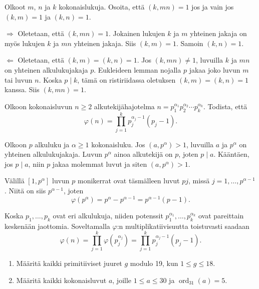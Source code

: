 \documentclass[11pt,a4paper]{amsart}
\begin{document}
\begin{exercise}
  Olkoot \(m\), \(n\) ja \(k\) kokonaislukuja. Osoita, että
  \((k,mn) = 1\) jos ja vain jos \((k,m) = 1\) ja
  \((k,n) = 1\).
\end{exercise}

\begin{solution}
  \(\Rightarrow\) Oletetaan, että \((k,mn)=1\). Jokainen lukujen
  \(k\) ja \(m\) yhteinen jakaja on myös lukujen \(k\) ja \(mn\) yhteinen
  jakaja. Siis \((k,m)=1\). Samoin \((k,n)=1\).

  \(\Leftarrow\) Oletetaan, että \((k,m)=(k,n)=1\). Jos
  \((k,mn)\ne 1\), luvuilla \(k\) ja \(mn\) on yhteinen
  alkulukujakaja \(p\). Eukleideen lemman nojalla \(p\) jakaa joko luvun
  \(m\) tai luvun \(n\). Koska \(p\mid k\), tämä on ristiriidassa
  oletuksen \((k,m)=(k,n)=1\) kanssa. Siis \((k,mn)=1\).
\end{solution}

\begin{exercise}
  Olkoon kokonaisluvun \(n \ge 2\) alkutekijähajotelma
  \(n = p_1^{\alpha_1} p_2^{\alpha_2} \cdots p_k^{\alpha_k}\).
  Todista, että
  \[
    \varphi(n) = \prod_{j=1}^{k} p_j^{\alpha_j-1}(p_j-1).
  \]
\end{exercise}

\begin{solution}
  Olkoon \(p\) alkuluku ja \(\alpha\ge 1\) kokonaisluku. Jos
  \((a,p^\alpha)>1\), luvuilla \(a\) ja \(p^\alpha\) on yhteinen
  alkulukujakaja. Luvun \(p^\alpha\) ainoa alkutekijä on \(p\), joten
  \(p\mid a\). Kääntäen, jos \(p\mid a\), niin \(p\) jakaa molemmat
  luvut ja siten \((a,p^\alpha)>1\).

  Välillä \([1,p^\alpha]\) luvun \(p\) monikerrat ovat täsmälleen
  luvut \(pj\), missä \(j=1,\dots,p^{\alpha-1}\). Niitä on siis
  \(p^{\alpha-1}\), joten
  \[
    \varphi(p^\alpha) = p^\alpha - p^{\alpha-1} = p^{\alpha-1}(p-1).
  \]

  Koska \(p_1,\dots,p_k\) ovat eri alkulukuja, niiden potenssit
  \(p_1^{\alpha_1},\dots,p_k^{\alpha_k}\) ovat pareittain keskenään
  jaottomia. Soveltamalla \(\varphi\):n multiplikatiivisuutta toistuvasti
  saadaan
  \[
    \varphi(n) = \prod_{j=1}^k \varphi(p_j^{\alpha_j})
    = \prod_{j=1}^k p_j^{\alpha_j-1}(p_j-1).
  \]
\end{solution}

\begin{exercise}
  \leavevmode\par
  \begin{enumerate}[label=(\alph*), topsep=0.35em]
    \item Määritä kaikki primitiiviset juuret \(g\) modulo 19, kun
      \(1 \le g \le 18\).
    \item Määritä kaikki kokonaisluvut \(a\), joille \(1 \le a \le 30\) ja
      \(\operatorname{ord}_{31}(a) = 5\).
  \end{enumerate}
\end{exercise}
\end{document}
